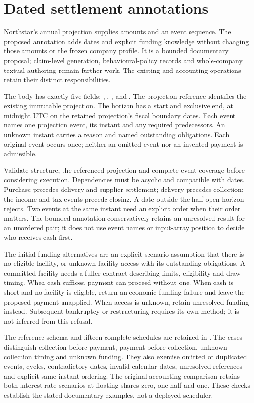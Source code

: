 \section{Dated settlement annotations}
\label{sec:settlement-schedule-draft}

Northstar's annual projection supplies amounts and an event sequence. The
proposed  annotation adds dates and explicit
funding knowledge without changing those amounts or the frozen company
profile. It is a bounded documentary proposal; claim-level generation,
behavioural-policy records and whole-company textual authoring remain further
work. The existing  and accounting operations retain
their distinct responsibilities.

The body has exactly five fields: , ,
,  and . The projection
reference identifies the existing immutable projection. The horizon has a
start and exclusive end, at midnight UTC on the retained projection's fiscal
boundary dates. Each event names one projection
event, its instant and any required predecessors. An unknown instant carries
a reason and named outstanding obligations. Each original event occurs once;
neither an omitted event nor an invented payment is admissible.

Validate structure, the referenced projection and complete event coverage
before considering execution. Dependencies must be acyclic and compatible
with dates. Purchase precedes delivery and supplier settlement; delivery
precedes collection; the income and tax events precede closing. A date outside
the half-open horizon rejects. Two events at the same instant need an explicit
order when their order matters. The bounded annotation conservatively retains
an unresolved result for an unordered pair; it does not use event names or
input-array position to decide who receives cash first.

The initial funding alternatives are an explicit scenario assumption that
there is no eligible facility, or unknown facility access with its outstanding
obligations. A committed facility needs a fuller contract describing limits,
eligibility and draw timing. When cash suffices, payment can proceed without
one. When cash is short and no facility is eligible, return an economic
funding failure and leave the proposed payment unapplied. When access is
unknown, retain unresolved funding instead. Subsequent bankruptcy or
restructuring requires its own method; it is not inferred from this refusal.

The reference schema and fifteen complete schedules are retained in
. The cases distinguish
collection-before-payment, payment-before-collection, unknown collection timing
and unknown funding. They also exercise omitted or duplicated events, cycles,
contradictory dates, invalid calendar dates, unresolved references and explicit
same-instant ordering. The original accounting comparison retains both
interest-rate scenarios at floating shares zero, one half and one. These
checks establish the stated documentary examples, not a deployed scheduler.
